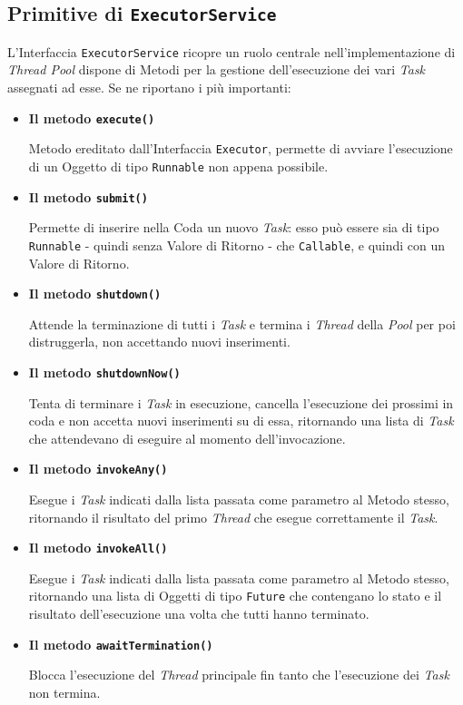 \subsection{Primitive di \texttt{ExecutorService}}
L'Interfaccia \texttt{ExecutorService} ricopre un ruolo centrale nell'implementazione di \textit{Thread Pool} dispone di Metodi per la gestione dell'esecuzione dei vari \textit{Task} assegnati ad esse. Se ne riportano i più importanti:
\begin{itemize}
    \item \textbf{Il metodo \texttt{execute()}} \par
    Metodo ereditato dall'Interfaccia \texttt{Executor}\cite{Executor_JavaDocs}, permette di avviare l’esecuzione di un Oggetto di tipo \texttt{Runnable} non appena possibile.
    \item \textbf{Il metodo \texttt{submit()}} \par
    Permette di inserire nella Coda un nuovo \textit{Task}: esso può essere sia di tipo \texttt{Runnable} - quindi senza Valore di Ritorno - che \texttt{Callable}, e quindi con un Valore di Ritorno.
    \item \textbf{Il metodo \texttt{shutdown()}} \par
    Attende la terminazione di tutti i \textit{Task} e termina i \textit{Thread} della \textit{Pool} per poi distruggerla, non accettando nuovi inserimenti.
    \item \textbf{Il metodo \texttt{shutdownNow()}} \par
    Tenta di terminare i \textit{Task} in esecuzione, cancella l'esecuzione dei prossimi in coda e non accetta nuovi inserimenti su di essa, ritornando una lista di \textit{Task} che attendevano di eseguire al momento dell'invocazione.
    \item \textbf{Il metodo \texttt{invokeAny()}} \par
    Esegue i \textit{Task} indicati dalla lista passata come parametro al Metodo stesso, ritornando il risultato del primo \textit{Thread} che esegue correttamente il \textit{Task}.
    \item \textbf{Il metodo \texttt{invokeAll()}} \par
    Esegue i \textit{Task} indicati dalla lista passata come parametro al Metodo stesso, ritornando una lista di Oggetti di tipo \texttt{Future} che contengano lo stato e il risultato dell'esecuzione una volta che tutti hanno terminato.
    \item \textbf{Il metodo \texttt{awaitTermination()}} \par
    Blocca l'esecuzione del \textit{Thread} principale fin tanto che l'esecuzione dei \textit{Task} non termina.
\end{itemize}
